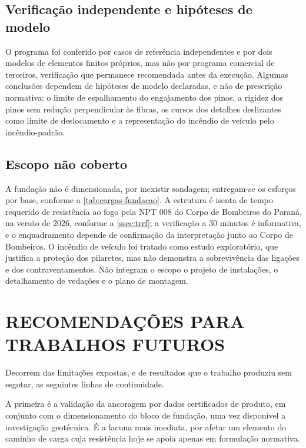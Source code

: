 \subsection{Verificação independente e hipóteses de modelo}\label{ssec:lim-modelo}

O programa foi conferido por casos de referência independentes e por dois
modelos de elementos finitos próprios, mas não por programa comercial de
terceiros, verificação que permanece recomendada antes da execução. Algumas
conclusões dependem de hipóteses de modelo declaradas, e não de prescrição
normativa: o limite de espalhamento do engajamento dos pinos, a rigidez dos pinos
sem redução perpendicular às fibras, os cursos dos detalhes deslizantes como
limite de deslocamento e a representação do incêndio de veículo pelo
incêndio-padrão.

\subsection{Escopo não coberto}\label{ssec:lim-escopo}

A fundação não é dimensionada, por inexistir sondagem; entregam-se os esforços
por base, conforme a \autoref{tab:cargas-fundacao}. A estrutura é isenta
de tempo requerido de resistência ao fogo pela NPT 008 do Corpo de Bombeiros do
Paraná, na versão de 2026, conforme a \autoref{ssec:trrf}; a verificação a 30
minutos é informativa, e o enquadramento depende de confirmação da interpretação
junto ao Corpo de Bombeiros. O incêndio de veículo foi tratado
como estudo exploratório, que justifica a proteção dos pilaretes, mas não
demonstra a sobrevivência das ligações e dos contraventamentos. Não integram o escopo o projeto
de instalações, o detalhamento de vedações e o plano de montagem.

\section{RECOMENDAÇÕES PARA TRABALHOS FUTUROS}\label{sec:recomendacoes}

Decorrem das limitações expostas, e de resultados que o trabalho produziu sem
esgotar, as seguintes linhas de continuidade.

A primeira é a validação da ancoragem por dados certificados de produto, em
conjunto com o dimensionamento do bloco de fundação, uma vez disponível a
investigação geotécnica. É a lacuna mais imediata, por afetar um elemento do
caminho de carga cuja resistência hoje se apoia apenas em formulação
normativa.

